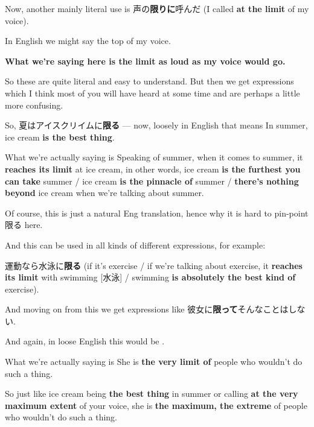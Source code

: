 {}

Now, another mainly literal use is 声の{\bf 限りに}呼んだ (I called {\bf at the limit} of my voice).

{}\crlf
In English we might say the top of my voice.

{\bf What we're saying here is the limit as loud as my voice would go.}

So these are quite literal and easy to understand. But then we get expressions which I think most of you will have heard at some time and are perhaps a little more confusing.

So, 夏はアイスクリイムに{\bf 限る} --- now, loosely in English that means In summer, ice cream {\bf is the best thing}.

{}

What we're actually saying is Speaking of summer, when it comes to summer, it {\bf reaches its limit} at ice cream, in other words, ice cream {\bf is the furthest you can take} summer / ice cream {\bf is the pinnacle of} summer / {\bf there's nothing beyond} ice cream when we're talking about summer.

Of course, this is just a natural Eng translation, hence why it is hard to pin-point 限る here.

\thinrule

And this can be used in all kinds of different expressions, for example:

運動なら水泳に{\bf 限る}\crlf
(if it's exercise / if we're talking about exercise, it {\bf reaches its limit} with swimming {[}水泳{]} / swimming {\bf is absolutely the best kind of} exercise).

{}

And moving on from this we get expressions like 彼女に{\bf 限って}そんなことはしない.

{}

And again, in loose English this would be .

What we're actually saying is She is {\bf the very limit of} people who wouldn't do such a thing.

\thinrule

So just like ice cream being {\bf the best thing} in summer or calling {\bf at the very maximum extent} of your voice, she is {\bf the maximum, the extreme} of people who wouldn't do such a thing.


